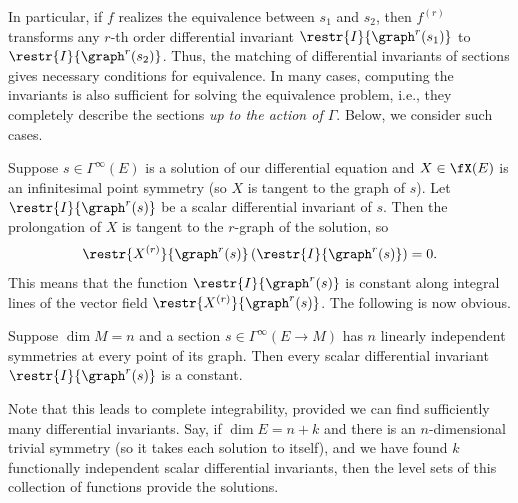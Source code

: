 In particular, if $f$ realizes the equivalence between $s_1$ and $s_2$, then $f^{(r)}$ transforms any $r$-th order differential invariant $\restr{I}{\graph^{r}(s_1)}$ to $\restr{I}{\graph^{r}(s_2)}$. Thus, the matching of differential invariants of sections gives necessary conditions for equivalence. In many cases, computing the invariants is also sufficient for solving the equivalence problem, i.e., they completely describe the sections \emph{up to the action of $\Gamma$}. Below, we consider such cases.

Suppose $s\in\Gamma^\infty(E)$ is a solution of our differential equation and $X\in\fX(E)$ is an infinitesimal point symmetry (so $X$ is tangent to the graph of $s$). Let $\restr{I}{\graph^r(s)}$ be a scalar differential invariant of $s$. Then the prolongation of $X$ is tangent to the $r$-graph of the solution, so
\[\restr{X^{(r)}}{\graph^r(s)}\left(\restr{I}{\graph^r(s)}\right)=0.\]
This means that the function $\restr{I}{\graph^r(s)}$ is constant along integral lines of the vector field $\restr{X^{(r)}}{\graph^r(s)}$. The following is now obvious.

\begin{prop}
    Suppose $\dim M=n$ and a section $s\in\Gamma^\infty(E\to M)$ has $n$ linearly independent symmetries at every point of its graph. Then every scalar differential invariant $\restr{I}{\graph^r(s)}$ is a constant.
\end{prop}

Note that this leads to complete integrability, provided we can find sufficiently many differential invariants. Say, if $\dim E=n+k$ and there is an $n$-dimensional trivial symmetry (so it takes each solution to itself), and we have found $k$ functionally independent scalar differential invariants, then the level sets of this collection of functions provide the solutions.

